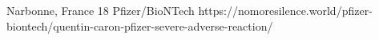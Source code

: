           {Narbonne, France}
          {18}
          {Pfizer/BioNTech}
          {}
          {
          }
          {https://nomoresilence.world/pfizer-biontech/quentin-caron-pfizer-severe-adverse-reaction/}


